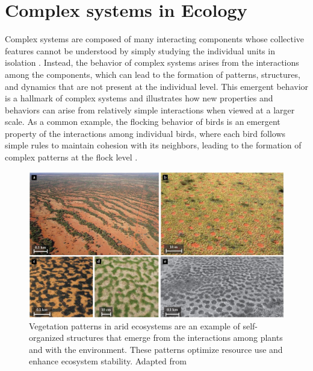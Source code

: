 \section{\label{sec:Complex systems in Ecology} Complex systems in Ecology}

Complex systems are composed of many interacting components
whose collective features cannot be understood by simply studying the
individual units in isolation \cite{Bianconi_2023}. Instead, the behavior of
complex systems arises from the interactions among the components, which can
lead to the formation of patterns, structures, and dynamics that are not
present at the individual level. This emergent behavior is a hallmark of
complex systems and illustrates how new properties and behaviors can arise from
relatively simple interactions when viewed at a larger scale. As a common
example, the flocking behavior of birds is an emergent property of the
interactions among individual birds, where each bird follows simple rules to
maintain cohesion with its neighbors, leading to the formation of complex
patterns at the flock level \cite{Vicsek1995}.

\begin{figure}[H]
  \centering
  \includegraphics[width=\textwidth]{Figures/vegetation_patterns.jpg}
  \caption{\label{fig:vegetation_patterns} Vegetation patterns in arid
    ecosystems
    are an example of self-organized structures that emerge from the
    interactions
    among plants and with the environment. These patterns optimize resource use
    and enhance ecosystem stability. Adapted from \cite{Ehud2019}}
\end{figure}

